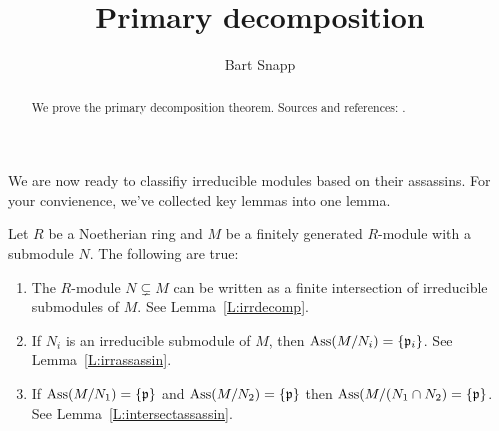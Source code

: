 \documentclass{ximera}
\author{Bart Snapp}
\title{Primary decomposition}
\begin{document}
\begin{abstract}
  We prove the primary decomposition theorem. Sources and references:
  \cite{sD2008,jpS2000}.
\end{abstract}
\maketitle

We are now ready to classifiy irreducible modules based on their
assassins. For your convienence, we've collected key lemmas into one lemma.

\begin{lemma}\label{L:biglempd}
  Let $R$ be a Noetherian ring and $M$ be a finitely generated
  $R$-module with a submodule $N$. The following are true:
  \begin{enumerate}
    \item The $R$-module $N\subsetneq M$ can be written as a finite
      intersection of irreducible submodules of $M$. See Lemma~\ref{L:irrdecomp}.
    \item If $N_i$ is an irreducible submodule of $M$, then
      $\operatorname{Ass}(M/N_i)=\{\mathfrak{p}_i\}$. See Lemma~\ref{L:irrassassin}.
    \item If $\operatorname{Ass}(M/N_1) = \{\mathfrak{p}\}$ and $\operatorname{Ass}(M/N_2) = \{\mathfrak{p}\}$ then
      $\operatorname{Ass}(M/(N_1\cap N_2) = \{\mathfrak{p}\}$. See
      Lemma~\ref{L:intersectassassin}.
  \end{enumerate}
\end{lemma}






\end{document}
